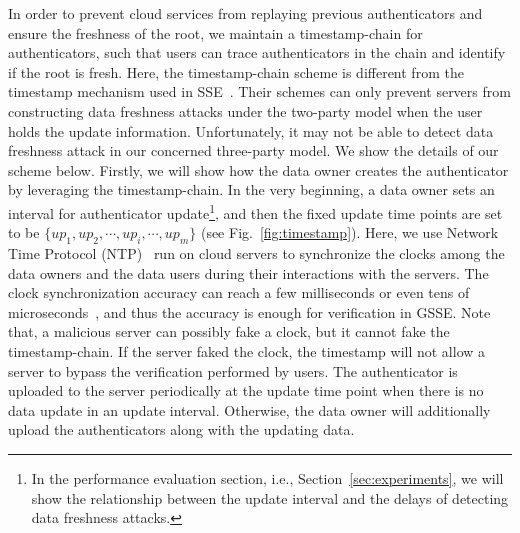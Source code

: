 In order to prevent cloud services from replaying previous authenticators and ensure the freshness of the root, we maintain a timestamp-chain for authenticators, such that users can trace authenticators in the chain and identify if the root is fresh. %
Here, the timestamp-chain scheme is different from the timestamp mechanism used in SSE~\cite{stefanov2014practical}. Their schemes can only prevent servers from constructing data freshness attacks under the two-party model when the user holds the update information. Unfortunately, it may not be able to detect data freshness attack in our concerned three-party model. We show the details of our scheme below.
Firstly, we will show how the data owner creates the authenticator by leveraging the timestamp-chain. In the very beginning, a data owner sets an interval for authenticator update\footnote{In the performance evaluation section, i.e., Section~\ref{sec:experiments}, we will show the relationship between the update interval and the delays of detecting data freshness attacks.}, and then the fixed update time points are set to be $\{up_1, up_2, \cdots, up_i, \cdots, up_m\}$ (see Fig.~\ref{fig:timestamp}).
Here, we use Network Time Protocol (NTP)~\cite{mills1991internet, mills2010network} run on cloud servers
to synchronize the clocks among the data owners and the data users
during their interactions with the servers. The clock synchronization
accuracy can reach a few milliseconds or even tens of microseconds~\cite{kopetz1987clock, elson2002fine, zhou2007accurate}, and thus the accuracy is enough for verification in
GSSE. Note that, a malicious server can possibly fake a clock,
but it cannot fake the timestamp-chain. If the server faked the clock, the timestamp will not allow a server to bypass the verification performed by users.
The authenticator is uploaded to the server periodically at the update time point when there is no data update in an update interval. Otherwise, the data owner will additionally upload the authenticators along with the updating data.


